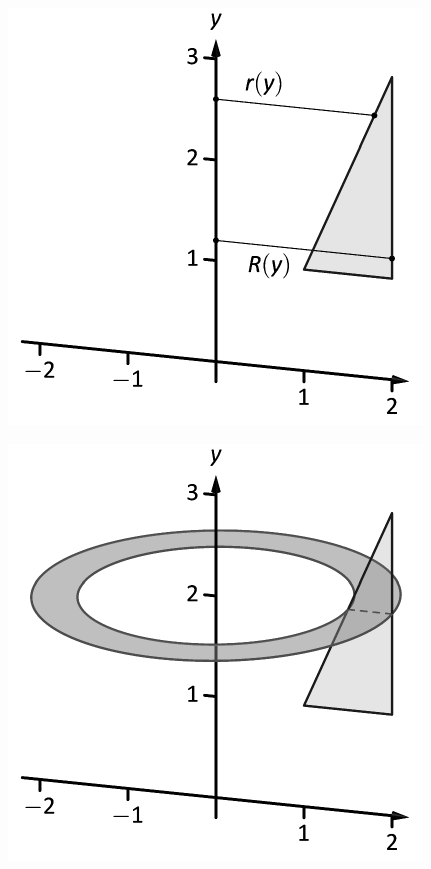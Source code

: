 \documentclass[10pt]{article}
\begin{document}
\includegraphics{figwash2a_3DBW.pdf}
\texttt{}

\includegraphics{figwash2b_3DBW.pdf}
\texttt{}
\end{document}
